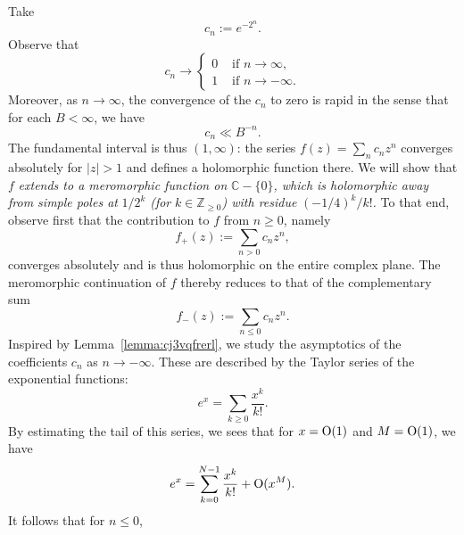 \documentclass[reqno]{amsart} 
\begin{document}
\begin{example}\label{example:cj4ungymno}
  Take
  \begin{equation*}
    c_n:= e^{- 2^n }.
  \end{equation*}
  Observe that
  \begin{equation*}
    c_n \rightarrow
    \begin{cases}
      0 &  \text{ if } n \rightarrow \infty, \\
      1 & \text{ if } n \rightarrow - \infty.
    \end{cases}
  \end{equation*}
  Moreover, as $n \rightarrow \infty$, the convergence of the $c_n$ to zero is rapid in the sense that for each $B < \infty$, we have
  \begin{equation*}
    c_n \ll B^{-n}.
  \end{equation*}
  The fundamental interval is thus $(1,\infty)$: the series $f(z) = \sum_{n} c_n z^n$ converges absolutely for $|z| > 1$ and defines a holomorphic function there.  We will show that $f$ \emph{extends to a meromorphic function on} $\mathbb{C} - \{0\}$\emph{, which is holomorphic away from simple poles at} $1 / 2^k$ \emph{(for} $k \in \mathbb{Z}_{\geq 0}$\emph{) with residue} $(-1/4)^k / k!$\emph{.}  To that end, observe first that the contribution to $f$ from $n \geq 0$, namely
  \begin{equation*}
    f_+(z) := \sum_{n > 0} c_n z^n,
  \end{equation*}
  converges absolutely and is thus holomorphic on the entire complex plane.  The meromorphic continuation of $f$ thereby reduces to that of the complementary sum
  \begin{equation*}
    f_-(z) := \sum_{n \leq  0} c_n z^n.
  \end{equation*}
  Inspired by Lemma~\ref{lemma:cj3vqfrerl}, we study the asymptotics of the coefficients $c_n$ as $n \rightarrow - \infty$.  These are described by the Taylor series of the exponential functions:
  \begin{equation*}
    e^{x} = \sum_{k \geq 0} \frac{x^k }{k!}.
  \end{equation*}
  By estimating the tail of this series, we sees that for $x = \operatorname{O}(1)$ and $M = \operatorname{O}(1)$, we have
  \begin{equation*}
    e^x = \sum_{k = 0}^{N-1} \frac{x^k}{k!} + \operatorname{O} (x^M).
  \end{equation*}
  It follows that for $n \leq 0$,
  \begin{equation}\label{eq:cj3wnu8lqf}

\end{equation}
\end{example}
\end{document}

